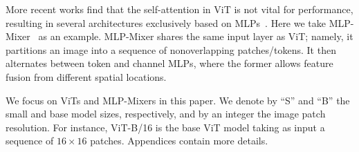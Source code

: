\documentclass{article}
\begin{document}

More recent works find that the self-attention in ViT is not vital for performance, resulting in several architectures  exclusively based on MLPs~\cite{tolstikhin2021mlpmixer,touvron2021resmlp,liu2021pay,melas2021you}. Here we take MLP-Mixer~\cite{tolstikhin2021mlpmixer} as an example. MLP-Mixer shares the same input layer as ViT; namely, it partitions an image into a sequence of nonoverlapping patches/tokens. It then alternates between token and channel MLPs, where the former allows feature fusion from different spatial locations. 

We focus on ViTs and MLP-Mixers in this paper. We denote by ``S'' and ``B''  the small and base model sizes, respectively, and by an integer the image patch resolution. For instance, ViT-B/16 is the base ViT model taking as input a sequence of $16\times16$ patches. Appendices contain more details.


\end{document}
